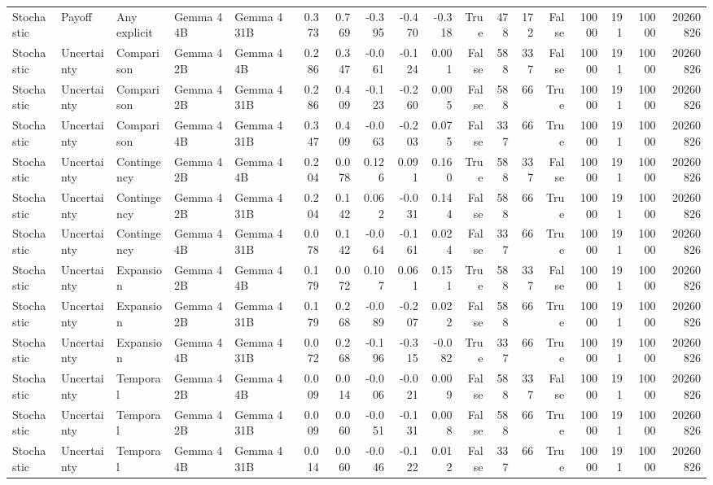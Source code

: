 \begin{tabular}{lllllrrrrrrrrrrrrr}
Stochastic & Payoff & Any explicit & Gemma 4 4B & Gemma 4 31B & 0.373 & 0.769 & -0.395 & -0.470 & -0.318 & True & 478 & 172 & False & 10000 & 191 & 10000 & 20260826 \\
Stochastic & Uncertainty & Comparison & Gemma 4 2B & Gemma 4 4B & 0.286 & 0.347 & -0.061 & -0.124 & 0.001 & False & 588 & 337 & False & 10000 & 191 & 10000 & 20260826 \\
Stochastic & Uncertainty & Comparison & Gemma 4 2B & Gemma 4 31B & 0.286 & 0.409 & -0.123 & -0.260 & 0.005 & False & 588 & 66 & True & 10000 & 191 & 10000 & 20260826 \\
Stochastic & Uncertainty & Comparison & Gemma 4 4B & Gemma 4 31B & 0.347 & 0.409 & -0.063 & -0.203 & 0.075 & False & 337 & 66 & True & 10000 & 191 & 10000 & 20260826 \\
Stochastic & Uncertainty & Contingency & Gemma 4 2B & Gemma 4 4B & 0.204 & 0.078 & 0.126 & 0.091 & 0.160 & True & 588 & 337 & False & 10000 & 191 & 10000 & 20260826 \\
Stochastic & Uncertainty & Contingency & Gemma 4 2B & Gemma 4 31B & 0.204 & 0.142 & 0.062 & -0.031 & 0.144 & False & 588 & 66 & True & 10000 & 191 & 10000 & 20260826 \\
Stochastic & Uncertainty & Contingency & Gemma 4 4B & Gemma 4 31B & 0.078 & 0.142 & -0.064 & -0.161 & 0.024 & False & 337 & 66 & True & 10000 & 191 & 10000 & 20260826 \\
Stochastic & Uncertainty & Expansion & Gemma 4 2B & Gemma 4 4B & 0.179 & 0.072 & 0.107 & 0.061 & 0.151 & True & 588 & 337 & False & 10000 & 191 & 10000 & 20260826 \\
Stochastic & Uncertainty & Expansion & Gemma 4 2B & Gemma 4 31B & 0.179 & 0.268 & -0.089 & -0.207 & 0.022 & False & 588 & 66 & True & 10000 & 191 & 10000 & 20260826 \\
Stochastic & Uncertainty & Expansion & Gemma 4 4B & Gemma 4 31B & 0.072 & 0.268 & -0.196 & -0.315 & -0.082 & True & 337 & 66 & True & 10000 & 191 & 10000 & 20260826 \\
Stochastic & Uncertainty & Temporal & Gemma 4 2B & Gemma 4 4B & 0.009 & 0.014 & -0.006 & -0.021 & 0.009 & False & 588 & 337 & False & 10000 & 191 & 10000 & 20260826 \\
Stochastic & Uncertainty & Temporal & Gemma 4 2B & Gemma 4 31B & 0.009 & 0.060 & -0.051 & -0.131 & 0.008 & False & 588 & 66 & True & 10000 & 191 & 10000 & 20260826 \\
Stochastic & Uncertainty & Temporal & Gemma 4 4B & Gemma 4 31B & 0.014 & 0.060 & -0.046 & -0.122 & 0.012 & False & 337 & 66 & True & 10000 & 191 & 10000 & 20260826 \\

\end{tabular}
